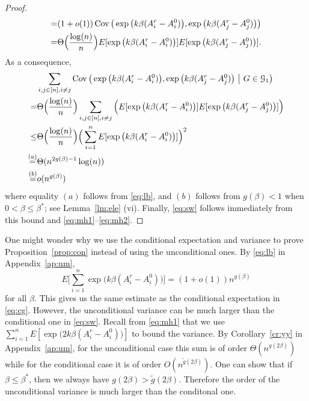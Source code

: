 \documentclass{article}
\begin{document}
\begin{proof}
\begin{align*}
= & (1+o(1)) \operatorname{Cov} \big(\exp\big(k\beta (A^r_i-A^0_i) \big), \exp\big(k\beta (A^r_j-A^0_j)  \big) \big) \\
= & \Theta\Big( \frac{\log(n)}{n} \Big) E[\exp\big(k\beta (A^r_i-A^0_i) \big)] E[\exp\big(k\beta (A^r_j-A^0_j) \big)] .
\end{align*}
As a consequence,
\begin{align*}
& \sum_{i,j\in[n],i\neq j}
\operatorname{Cov} \big(\exp\big(k\beta (A^r_i-A^0_i) \big), \exp\big(k\beta (A^r_j-A^0_j) \big) ~\big|~ G\in\mathcal{G}_1 \big) \\
= & \Theta\Big( \frac{\log(n)}{n} \Big) \sum_{i,j\in[n],i\neq j} \Big( E[\exp\big(k\beta (A^r_i-A^0_i) \big)] E[\exp\big(k\beta (A^r_j-A^0_j) \big)] \Big) \\
\le & \Theta\Big( \frac{\log(n)}{n} \Big)
\Big(\sum_{i=1}^n  E[\exp\big(k\beta (A^r_i-A^0_i) \big)] \Big)^2 \\
\overset{(a)}{=} & \Theta(n^{2g(\beta)-1} \log(n)) \\
\overset{(b)}{=} & o(n^{g(\beta)})
\end{align*}
where equality $(a)$ follows from \eqref{eq:lb}, and $(b)$ follows from $g(\beta)<1$ when $0<\beta\le\beta^\ast$; see Lemma~\ref{lm:ele} (vi).
Finally, \eqref{eq:sw} follows immediately from this bound and \eqref{eq:mh1}--\eqref{eq:mh2}.
\end{proof}

\begin{remark}
One might wonder why we use the conditional expectation and variance to prove Proposition~\ref{prop:con} instead of using the unconditional ones. By \eqref{eq:lb} in Appendix~\ref{ap:um},
$$
E \Big[ \sum_{i=1}^n  \exp\big(k\beta (A^r_i-A^0_i) \big) \Big]
= (1+o(1)) n^{g(\beta)}  
$$
for all $\beta$. This gives us the same estimate as the conditional expectation in \eqref{eq:cg}. However, the unconditional variance can be much larger than the conditional one in \eqref{eq:sw}. Recall from \eqref{eq:mh1} that we use $\sum_{i=1}^n E[ \exp\big(2k\beta (A^r_i-A^0_i) \big)]$ to bound the variance. 
By Corollary~\ref{cr:yy} in Appendix~\ref{ap:um},
for the unconditional case this sum is of order $\Theta(n^{g(2\beta)})$ while for the conditional case it is of order $O(n^{\tilde{g}(2\beta)})$. One can show that if $\beta\le\beta^\ast$, then we always have $g(2\beta)>\tilde{g}(2\beta)$. Therefore the order of the unconditional variance is much larger than the conditonal one.
\end{remark}
\end{document}
